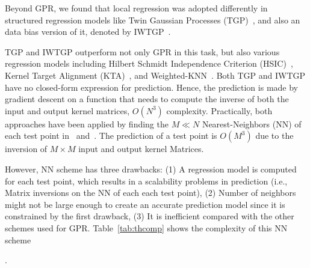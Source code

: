 \begin{comment}
There have been increasing discriminative approaches to tackle pose reconstruction. These approaches were either based on nearest-neighbor schemes \cite{Shakhnarovich, Poppe07} or parametric predictors \cite{Rosales01learningbody, Agarwal06, Sminchisescu:2007}, trained using images of people and their corresponding 3d ground truth pose. A common drawback of these early approaches is that  they do not model the correlation between the outputs. This correlation  was successfully captured in~\cite{Bo:2010} by Twin Gaussian Processes (TGP). Yamada et al~\cite{Yamada:2012}  then proposed a covariance shift approach for TGP  to solve the data bias problem of the training data. In the remaining of this section, we focus on Twin Gaussian Processes work in~\cite{Bo:2010,Yamada:2012}.
\end{comment}

Beyond GPR, we found that local regression was adopted differently in structured regression models like Twin Gaussian Processes (TGP)~\cite{Bo:2010}, and also an data bias version of it, denoted by  IWTGP~\cite{Yamada:2012}. TGP and IWTGP outperform not only GPR in this task, but also various regression models including Hilbert Schmidt Independence Criterion (HSIC)~\cite{HSIC05}, Kernel Target Alignment (KTA)~\cite{KTA01}, and Weighted-KNN~\cite{Rasmussen:2005}. Both TGP and IWTGP have no closed-form expression for prediction. Hence, the prediction is made by gradient descent on a function that needs to compute the inverse of both the input and output kernel matrices, $O(N^3)$ complexity. Practically,  both approaches have been applied by finding the $M \ll N$ Nearest-Neighbors (NN) of each test  point in~\cite{Bo:2010} and~\cite{Yamada:2012}. The prediction of a test point is  $O(M^3)$ due to the inversion of $M \times M$ input and output kernel Matrices.  However, NN scheme has three drawbacks: (1) A regression model is computed for each test  point, which results in a scalability  problems in prediction (i.e., Matrix inversions on the NN of each each test point), (2) Number of neighbors might not be large enough to create an accurate prediction model since it is constrained by the first drawback, (3) It is inefficient compared with the other schemes used for GPR. Table~\ref{tab:thcomp} shows the complexity of this NN scheme.

